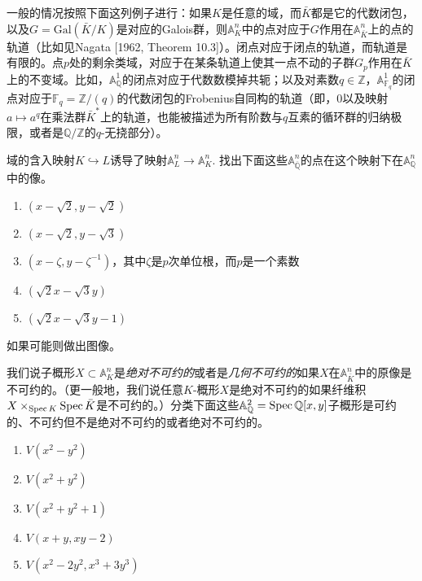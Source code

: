 一般的情况按照下面这列例子进行：如果$K$是任意的域，而$\bar K$都是它的代数闭包，以及$G=\mathrm{Gal}(\bar K/K)$是对应的Galois群，则$\mathbb{A}_{K}^n$中的点对应于$G$作用在$\mathbb{A}_{\bar K}^n$上的点的轨道（比如见Nagata [1962, Theorem 10.3]）。闭点对应于闭点的轨道，而轨道是有限的。点$p$处的剩余类域，对应于在某条轨道上使其一点不动的子群$G_p$作用在$\bar K$上的不变域。比如，$\mathbb{A}^1_\mathbb{Q}$的闭点对应于代数数模掉共轭；以及对素数$q\in \mathbb{Z}$，$\mathbb{A}_{\mathbb{F}_q}^1$的闭点对应于$\mathbb{F}_q=\mathbb{Z}/(q)$的代数闭包的Frobenius自同构的轨道（即，$0$以及映射$a\mapsto a^q$在乘法群$\bar K^*$上的轨道，也能被描述为所有阶数与$q$互素的循环群的归纳极限，或者是$\mathbb{Q}/\mathbb{Z}$的$q$-无挠部分）。

\begin{exe}
	域的含入映射$K\hookrightarrow L$诱导了映射$\mathbb{A}_L^n\to \mathbb{A}_K^n$. 找出下面这些$\mathbb{A}_{\overline{\mathbb{Q}}}^n$的点在这个映射下在$\mathbb{A}_{\mathbb{Q}}^n$中的像。

	\begin{enumerate}[{(a)}]\setlength{\itemsep}{0pt}
		\item $(x-\sqrt{2},y-\sqrt{2})$
		\item $(x-\sqrt{2},y-\sqrt{3})$
		\item $(x-\zeta,y-\zeta^{-1})$，其中$\zeta$是$p$次单位根，而$p$是一个素数
		\item $(\sqrt{2}x-\sqrt{3}y)$
		\item $(\sqrt{2}x-\sqrt{3}y-1)$
	\end{enumerate}
	如果可能则做出图像。
\end{exe}

\begin{exe}
	我们说子概形$X\subset \mathbb{A}_K^n$是\textit{绝对不可约的}或者是\textit{几何不可约的}如果$X$在$\mathbb{A}_{\bar K}^n$中的原像是不可约的。（更一般地，我们说任意$K$-概形$X$是绝对不可约的如果纤维积$X\times_{\operatorname{Spec} K}\operatorname{Spec} \bar{K}$是不可约的。）分类下面这些$\mathbb{A}_\mathbb{Q}^2=\operatorname{Spec} \mathbb{Q}[x,y]$子概形是可约的、不可约但不是绝对不可约的或者绝对不可约的。

	\begin{enumerate}[{(a)}]\setlength{\itemsep}{0pt}
		\item $V(x^2-y^2)$
		\item $V(x^2+y^2)$
		\item $V(x^2+y^2+1)$
		\item $V(x+y,xy-2)$
		\item $V(x^2-2y^2,x^3+3y^3)$
	\end{enumerate}
\end{exe}

